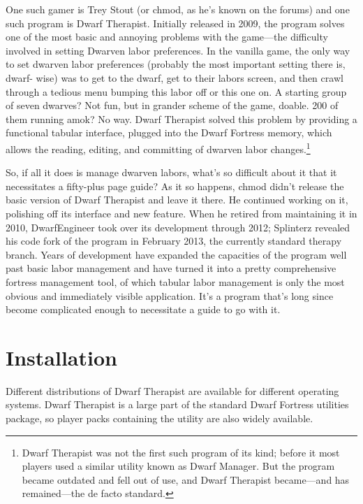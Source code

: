 \documentclass[]{article}
\begin{document}
One such gamer is Trey Stout (or chmod, as he's known on the forums) and one such program is Dwarf
Therapist. Initially released in 2009, the program solves one of the most basic and annoying
problems with the game---the difficulty involved in setting Dwarven labor preferences. In the vanilla
game, the only way to set dwarven labor preferences (probably the most important setting there is, dwarf-
wise) was to get to the dwarf, get to their labors screen, and then crawl through a tedious menu bumping
this labor off or this one on.
A starting group of seven dwarves? Not fun, but in grander scheme of the game, doable. 200 of them
running amok? No way. Dwarf Therapist solved this problem  by providing a functional tabular
interface, plugged into the Dwarf Fortress memory, which allows the reading, editing, and committing of
dwarven labor changes.\footnote{Dwarf Therapist was not the first such program of its kind; before it
most players used a similar utility known as Dwarf Manager. But the program became outdated and fell out
of use, and Dwarf Therapist became---and has remained---the de facto standard.}

So, if all it does is manage dwarven labors, what's so difficult about it that it necessitates a
fifty-plus page guide? As it so happens, chmod didn't release the basic version of Dwarf Therapist and
leave it there. He continued working on it, polishing off its interface and new feature. When
he retired from maintaining it in 2010, DwarfEngineer took over its development through 2012; Splinterz
revealed his code fork of the program in February 2013, the currently standard therapy branch. Years of
development have expanded the capacities of the program well past basic labor management and have turned
it into a pretty comprehensive fortress management tool, of which tabular labor management is only the
most obvious and immediately visible application. It's a program that's long since become complicated
enough to necessitate a guide to go with it.

\newpage

\section{Installation}
\label{sec:Installation}
Different distributions of Dwarf Therapist are available for different operating systems. Dwarf Therapist
is a large part of the standard Dwarf Fortress utilities package, so player packs containing the
utility are also widely available.

\vspace{12pt}
\end{document}
